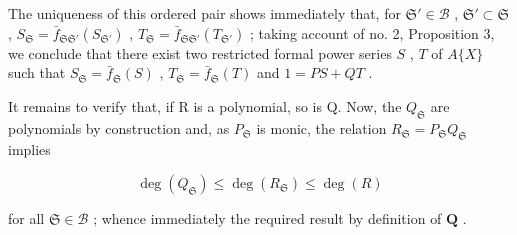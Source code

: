 The uniqueness of this ordered pair shows immediately that, for \(\mathfrak{S}' \in \mathcal{B}\) , \(\mathfrak{S}' \subset \mathfrak{S}\) , \(S_{\mathfrak{S}} = \bar{f}_{\mathfrak{S}\mathfrak{S}'}(S_{\mathfrak{S}'})\) , \(T_{\mathfrak{S}} = \bar{f}_{\mathfrak{S}\mathfrak{S}'}(T_{\mathfrak{S}'})\) ; taking account of no. 2, Proposition 3, we conclude that there exist two restricted formal power series \(S\) , \(T\) of \(A\{X\}\) such that \(S_{\mathfrak{S}} = \bar{f}_{\mathfrak{S}}(S)\) , \(T_{\mathfrak{S}} = \bar{f}_{\mathfrak{S}}(T)\) and \(1 = PS + QT\) .

It remains to verify that, if R is a polynomial, so is Q. Now, the \(Q_{\mathfrak{S}}\) are polynomials by construction and, as \(P_{\mathfrak{S}}\) is monic, the relation \(R_{\mathfrak{S}} = P_{\mathfrak{S}}Q_{\mathfrak{S}}\) implies

\[
\deg (Q _ {\mathfrak {S}}) \leqslant \deg (R _ {\mathfrak {S}}) \leqslant \deg (R)
\]

for all \(\mathfrak{S} \in \mathcal{B}\) ; whence immediately the required result by definition of \(\mathbf{Q}\) .
\relax{}

